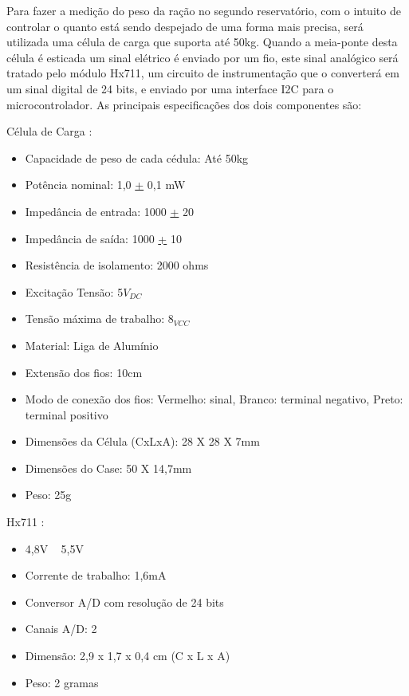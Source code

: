 Para fazer a medição do peso da ração no segundo reservatório, com o intuito de controlar o quanto está sendo despejado de uma forma mais precisa, será utilizada uma célula de carga que suporta até 50kg. Quando a meia-ponte desta célula é esticada um sinal elétrico é enviado por um fio, este sinal analógico será tratado pelo módulo Hx711, um circuito de instrumentação que o converterá em um sinal digital de 24 bits, e enviado por uma interface I2C para o microcontrolador. As principais especificações dos dois componentes são:

Célula de Carga \cite{mercado}:
\begin{itemize}
\item Capacidade de peso de cada cédula: Até 50kg
\item Potência nominal: 1,0 \underline{+} 0,1 mW
\item Impedância de entrada: 1000 \underline{+} 20%
\item Impedância de saída: 1000 \underline{+} 10%
\item Resistência de isolamento: 2000 ohms
\item Excitação Tensão: 5$V_{DC}$
\item Tensão máxima de trabalho: $8_{VCC}$
\item Material: Liga de Alumínio
\item Extensão dos fios: 10cm
\item Modo de conexão dos fios: Vermelho: sinal, Branco: terminal negativo, Preto: terminal positivo
\item Dimensões da Célula (CxLxA): 28 X 28 X 7mm
\item Dimensões do Case: 50 X 14,7mm
\item Peso: 25g
\end{itemize}

Hx711 \cite{mercado1}:
\begin{itemize}
\item 4,8V ~ 5,5V
\item Corrente de trabalho: 1,6mA
\item Conversor A/D com resolução de 24 bits
\item Canais A/D: 2
\item Dimensão: 2,9 x 1,7 x 0,4 cm (C x L x A)
\item Peso: 2 gramas
\end{itemize}


